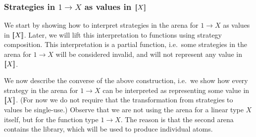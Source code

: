 \subsubsection{Strategies in $1 \to X$ as values in $[{\kern-0.45ex}[X]{\kern-0.45ex}]$}
\label{sec:strategies-in-1-to-x-as-elements-of-sem-x}
We start by showing how to interpret strategies in the arena for  $1 \to X$ as values in $[{\kern-0.45ex}[X]{\kern-0.45ex}]$. Later, we will lift  this interpretation to functions  using strategy composition. This interpretation is a partial function, i.e.~some strategies in the arena for $1 \to X$ will be considered invalid, and will not represent any value in $[{\kern-0.45ex}[X]{\kern-0.45ex}]$. 

We now describe the converse of the above construction, i.e.~we show how every strategy in the arena for $1 \to X$ can be interpreted as representing some value in $[{\kern-0.45ex}[X]{\kern-0.45ex}]$. (For now we do not require that the transformation from strategies to values be single-use.)
Observe that we are not using the arena for a linear type $X$ itself, but for the function type $1 \to X$. The reason is that the second arena contains the library, which will be used to produce individual atoms. 

